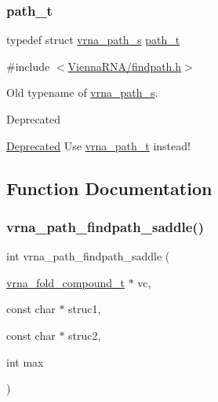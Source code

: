 \subsubsection{\texorpdfstring{path\+\_\+t}{path\_t}}
{\footnotesize\ttfamily typedef struct \hyperlink{group__direct__paths_structvrna__path__s}{vrna\+\_\+path\+\_\+s} \hyperlink{group__direct__paths_gab6b8737d5377e70a7815d04aae7fd884}{path\+\_\+t}}



{\ttfamily \#include $<$\hyperlink{findpath_8h}{Vienna\+R\+N\+A/findpath.\+h}$>$}



Old typename of \hyperlink{group__direct__paths_structvrna__path__s}{vrna\+\_\+path\+\_\+s}. 

\begin{DoxyRefDesc}{Deprecated}
\item[\hyperlink{deprecated__deprecated000067}{Deprecated}]Use \hyperlink{group__direct__paths_ga818d4f3d1cf8723d6905990b08d909fe}{vrna\+\_\+path\+\_\+t} instead! \end{DoxyRefDesc}


\subsection{Function Documentation}
\mbox{\label{group__direct__paths_ga957922acc1bcaa97f52cbd0975f7dcd0}} 
\subsubsection{\texorpdfstring{vrna\+\_\+path\+\_\+findpath\+\_\+saddle()}{vrna\_path\_findpath\_saddle()}}
{\footnotesize\ttfamily int vrna\+\_\+path\+\_\+findpath\+\_\+saddle (\begin{DoxyParamCaption}\item[{\hyperlink{group__fold__compound_ga1b0cef17fd40466cef5968eaeeff6166}{vrna\+\_\+fold\+\_\+compound\+\_\+t} $\ast$}]{vc,  }\item[{const char $\ast$}]{struc1,  }\item[{const char $\ast$}]{struc2,  }\item[{int}]{max }\end{DoxyParamCaption})}



